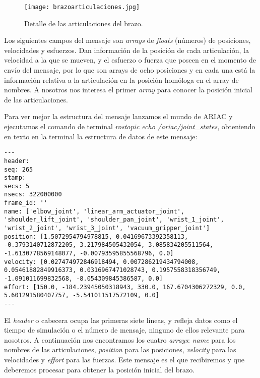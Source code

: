 \begin{figure}[]
	\centering\texttt{[image: brazoarticulaciones.jpg]}
	\caption{Detalle de las articulaciones del brazo.}
	\label{fig:brazoarticulaciones}
\end{figure}

Los siguientes campos del mensaje son \textit{arrays} de \textit{floats} (números) de posiciones, velocidades y esfuerzos. Dan información de la posición de cada articulación, la velocidad a la que se mueven, y el esfuerzo o fuerza que poseen en el momento de envío del mensaje, por lo que son arrays de ocho posiciones y en cada una está la información relativa a la articulación en la posición homóloga en el array de nombres. A nosotros nos interesa el primer \textit{array} para conocer la posición inicial de las articulaciones.

Para ver mejor la estructura del mensaje lanzamos el mundo de ARIAC y ejecutamos el comando de terminal \textit{rostopic echo /ariac/joint\_states}, obteniendo en texto en la terminal la estructura de datos de este mensaje:

\begin{lstlisting}
---
header: 
seq: 265
stamp: 
secs: 5
nsecs: 322000000
frame_id: ''
name: ['elbow_joint', 'linear_arm_actuator_joint', 'shoulder_lift_joint', 'shoulder_pan_joint', 'wrist_1_joint', 'wrist_2_joint', 'wrist_3_joint', 'vacuum_gripper_joint']
position: [1.5072954794978815, 0.04169673392358113, -0.3793140712872205, 3.217984505432054, 3.085834205511564, -1.6130778569148077, -0.00793595855568796, 0.0]
velocity: [0.027474972846918494, 0.007286219434794008, 0.05461882849916373, 0.0316967471028743, 0.1957558318356749, -1.091011699832568, -8.054309845386587, 0.0]
effort: [150.0, -184.23945050318943, 330.0, 167.6704306272329, 0.0, 5.601291580407757, -5.541011517572109, 0.0]
---
\end{lstlisting}

El \textit{header} o cabecera ocupa las primeras siete líneas, y refleja datos como el tiempo de simulación o el número de mensaje, ninguno de ellos relevante para nosotros. A continuación nos encontramos los cuatro \textit{arrays}: \textit{name} para los nombres de las articulaciones, \textit{position} para las posiciones, \textit{velocity} para las velocidades y \textit{effort} para las fuerzas. Este mensaje es el que recibiremos y que deberemos procesar para obtener la posición inicial del brazo.

